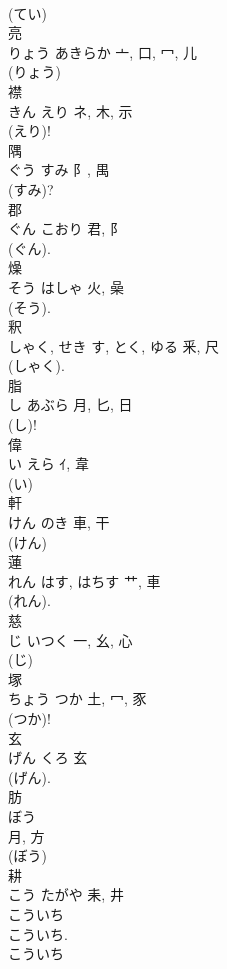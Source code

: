 \documentclass[8pt]{extreport}
\begin{document}
\begin{CJK}{UTF8}{min}
\\	(てい) 
\\	亮	
\\	りょう	あきらか	亠, 口, 冖, 儿	
\\	(りょう) 
\\	襟	
\\	きん	えり	ネ, 木, 示	
\\	(えり)!
\\	隅	
\\	ぐう	すみ	阝, 禺	
\\	(すみ)?	
\\	郡	
\\	ぐん	こおり	君, 阝	
\\	(ぐん). 
\\	燥	
\\	そう	はしゃ	火, 喿	
\\	(そう). 
\\	釈	
\\	しゃく, せき	す, とく, ゆる	釆, 尺	
\\	(しゃく). 
\\	脂	
\\	し	あぶら	月, 匕, 日	
\\	(し)!	
\\	偉	
\\	い	えら	ｲ, 韋	
\\	(い) 
\\	軒	
\\	けん	のき	車, 干	
\\	(けん) 
\\	蓮	
\\	れん	はす, はちす	艹, 車		
\\	(れん).	
\\	慈	
\\	じ	いつく	一, 幺, 心		
\\	(じ) 
\\	塚	
\\	ちょう	つか	土, 冖, 豕	
\\	(つか)! 
\\	玄	
\\	げん	くろ	玄	
\\	(げん). 
\\	肪	
\\	ぼう	
\\	月, 方	
\\	(ぼう) 
\\	耕	
\\	こう	たがや	耒, 井	
\\	こういち
\\	こういち. 
\\	こういち 

\end{CJK}
\end{document}
